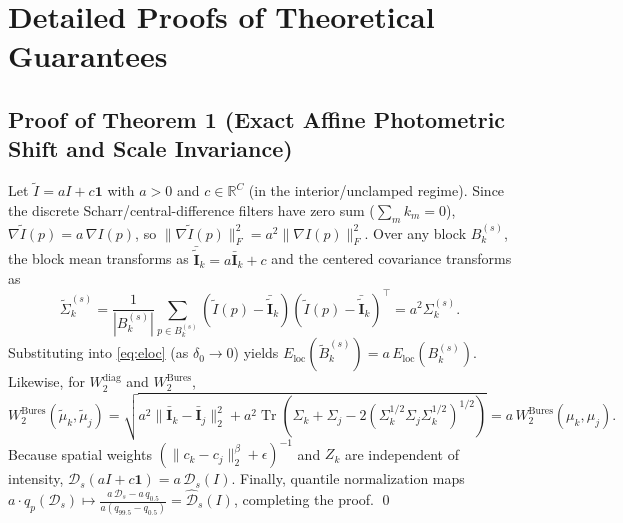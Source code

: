 \appendix
\section{Detailed Proofs of Theoretical Guarantees}
\label{app:proofs}

\subsection{Proof of Theorem 1 (Exact Affine Photometric Shift and Scale Invariance)}
Let $\tilde{I} = aI + c\mathbf{1}$ with $a > 0$ and $c \in \mathbb{R}^C$ (in the interior/unclamped regime). Since the discrete Scharr/central-difference filters have zero sum ($\sum_m k_m = 0$), $\nabla \tilde{I}(p) = a\,\nabla I(p)$, so $\lVert \nabla \tilde{I}(p) \rVert_F^2 = a^2 \lVert \nabla I(p) \rVert_F^2$. Over any block $B_k^{(s)}$, the block mean transforms as $\bar{\tilde{\mathbf{I}}}_k = a\bar{\mathbf{I}}_k + c$ and the centered covariance transforms as
\[
\tilde{\Sigma}_k^{(s)} = \frac{1}{|B_k^{(s)}|} \sum_{p \in B_k^{(s)}} (\tilde{I}(p) - \bar{\tilde{\mathbf{I}}}_k)(\tilde{I}(p) - \bar{\tilde{\mathbf{I}}}_k)^\top = a^2 \Sigma_k^{(s)}.
\]
Substituting into \eqref{eq:eloc} (as $\delta_0 \to 0$) yields $E_{\mathrm{loc}}(\tilde{B}_k^{(s)}) = a\,E_{\mathrm{loc}}(B_k^{(s)})$. Likewise, for $W_2^{\mathrm{diag}}$ and $W_2^{\mathrm{Bures}}$,
\[
W_2^{\mathrm{Bures}}(\tilde{\mu}_k, \tilde{\mu}_j) = \sqrt{a^2 \lVert \bar{\mathbf{I}}_k - \bar{\mathbf{I}}_j \rVert_2^2 + a^2 \operatorname{Tr}\!\left(\Sigma_k + \Sigma_j - 2(\Sigma_k^{1/2}\Sigma_j\Sigma_k^{1/2})^{1/2}\right)} = a\,W_2^{\mathrm{Bures}}(\mu_k, \mu_j).
\]
Because spatial weights $(\lVert c_k - c_j\rVert_2^\beta + \epsilon)^{-1}$ and $Z_k$ are independent of intensity, $\mathcal{D}_s(aI + c\mathbf{1}) = a\,\mathcal{D}_s(I)$. Finally, quantile normalization maps $a \cdot q_p(\mathcal{D}_s) \mapsto \frac{a\,\mathcal{D}_s - a\,q_{0.5}}{a(q_{99.5} - q_{0.5})} = \widehat{\mathcal{D}}_s(I)$, completing the proof. \qed

